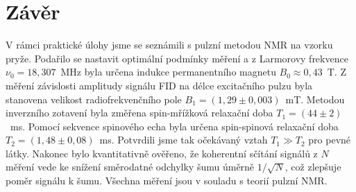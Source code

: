\section{Závěr}
V rámci praktické úlohy jsme se seznámili s pulzní metodou NMR na vzorku pryže. Podařilo se nastavit optimální podmínky měření a z Larmorovy frekvence $\nu_0 = 18,307$~MHz byla určena indukce permanentního magnetu $B_0 \approx 0,43$~T. Z měření závislosti amplitudy signálu FID na délce excitačního pulzu byla stanovena velikost radiofrekvenčního pole $B_1 = (1,29 \pm 0,003)$~mT. Metodou inverzního zotavení byla změřena spin-mřížková relaxační doba $T_1 = (44 \pm 2)$~ms. Pomocí sekvence spinového echa byla určena spin-spinová relaxační doba $T_2 = (1,48 \pm 0,08)$~ms. Potvrdili jsme tak očekávaný vztah $T_1 \gg T_2$ pro pevné látky. Nakonec bylo kvantitativně ověřeno, že koherentní sčítání signálů z $N$ měření vede ke snížení směrodatné odchylky šumu úměrně $1/\sqrt{N}$, což zlepšuje poměr signálu k šumu. Všechna měření jsou v souladu s teorií pulzní NMR.